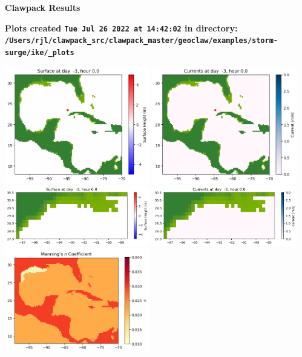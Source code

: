 \documentclass[11pt]{article}
\begin{document}
        \begin{center}{\Large\bf Clawpack Results}\vskip 5pt
        
        \bf Plots created {\tt Tue Jul 26 2022 at 14:42:02} in directory: \vskip 5pt
        \verb+/Users/rjl/clawpack_src/clawpack_master/geoclaw/examples/storm-surge/ike/_plots+
        \end{center}
        \vskip 5pt
        \includegraphics[width=0.475\textwidth]{frame0000fig1001.png}
\includegraphics[width=0.475\textwidth]{frame0000fig1002.png}
\vskip 10pt 
\includegraphics[width=0.475\textwidth]{frame0000fig1003.png}
\includegraphics[width=0.475\textwidth]{frame0000fig1004.png}
\vskip 10pt 
\includegraphics[width=0.475\textwidth]{frame0000fig1005.png}
\end{document}
